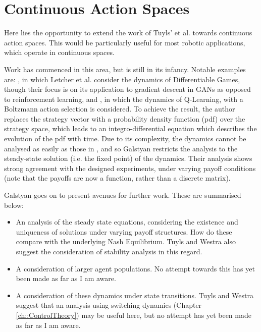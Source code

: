 \documentclass[../sample.tex]{subfiles}
\begin{document}
    \section{Continuous Action Spaces}

    Here lies the opportunity to extend the work of Tuyls' et al. \cite{Tuyls2006AnGames} towards
    continuous action spaces. This would be particularly useful for most robotic applications, which
    operate in continuous spaces. 

    Work has commenced in this area, but is still in its infancy. Notable examples are: 
    \cite{Letcher2019DifferentiableMechanics}, in which Letcher et al. consider the dynamics of
    Differentiable Games, though their focus is on its application to gradient descent in GANs as
    opposed to reinforcement learning, and \cite{Galstyan2013}, in which the dynamics of Q-Learning,
    with a Boltzmann action selection is considered. To achieve the result, the author replaces the
    strategy vector with a probability density function (pdf) over the strategy space, which leads
    to an integro-differential equation which describes the evolution of the pdf with time. Due to
    its complexity, the dynamics cannot be analysed as easily as those in \cite{Tuyls2006AnGames},
    and so Galstyan restricts the analysis to the steady-state solution (i.e. the fixed point) of
    the dynamics. Their analysis shows strong agreement with the designed experiments, under varying
    payoff conditions (note that the payoffs are now a function, rather than a discrete matrix).

    Galstyan goes on to present avenues for further work. These are summarised below:

    \begin{itemize}
        \item  An analysis of the steady state equations, considering the existence and uniqueness
        of solutions under varying payoff structures. How do these compare with the underlying Nash
        Equilibrium. Tuyls and Westra also suggest the consideration of stability analysis in this regard.
        \item A consideration of larger agent populations. No attempt towards this has yet been made
        as far as I am aware.
        \item A consideration of these dynamics under state transitions. Tuyls and Westra suggest
        that an analysis using switching dynamics (Chapter \ref{ch::ControlTheory}) may be useful
        here, but no attempt has yet been made as far as I am aware.
    \end{itemize}
\end{document}
